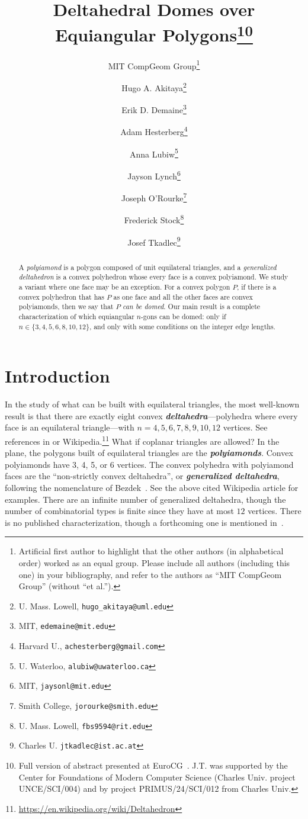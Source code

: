 \documentclass[11pt]{article}
\title{%
Deltahedral Domes over Equiangular Polygons\footnote{%
Full version of abstract presented at EuroCG~\cite{DomesEuroCG}.
J.T. was supported by the Center for Foundations of Modern Computer Science (Charles Univ. project UNCE/SCI/004) and by project PRIMUS/24/SCI/012 from Charles Univ.}
} %
\author{%
MIT CompGeom Group\thanks{%
Artificial first author to highlight that the other authors
(in alphabetical order) worked as an equal group.
Please include all authors (including this one) in your bibliography,
and refer to the authors as ``MIT CompGeom Group'' (without ``et al.'').}
\and
Hugo A. Akitaya\thanks{%
U. Mass. Lowell, \texttt{hugo\_akitaya@uml.edu}}
\and
Erik D. Demaine\thanks{%
MIT, \texttt{edemaine@mit.edu}}
\and
Adam Hesterberg\thanks{%
Harvard U., \texttt{achesterberg@gmail.com}}
\and
Anna Lubiw\thanks{%
U. Waterloo, \texttt{alubiw@uwaterloo.ca}}
\and
Jayson Lynch\thanks{%
MIT, \texttt{jaysonl@mit.edu}}
\and
Joseph O'Rourke\thanks{%
Smith College, \texttt{jorourke@smith.edu}}
\and
Frederick Stock\thanks{%
U. Mass. Lowell, \texttt{fbs9594@rit.edu}} 
\and
Josef Tkadlec\thanks{%
Charles U.
\texttt{jtkadlec@ist.ac.at}}
}%
\newcommand{\seclab}[1]{\label{sec:#1}}
\def\defn#1{\textit{\textbf{\boldmath #1}}}
\newcommand{\JOR}[1]{{\color{red} JOR: [#1]}}
\newcommand{\jor}[1]{{\color{cyan} #1}}
\newcommand{\Anna}[1]{{\color{red} Anna: [#1]}}
\begin{document}
\date{}
\maketitle



\begin{abstract}
A \emph{polyiamond} is a polygon composed of unit equilateral triangles, and
a \emph{generalized deltahedron}
is a convex polyhedron %
whose every face is a convex polyiamond.
We study a variant where one face may be an exception.
For a convex polygon $P$, 
if there is a convex polyhedron that has $P$ as one face and all the other faces are convex polyiamonds, then we say that 
$P$ \emph{can be domed}.
Our main result is a complete characterization of 
which equiangular $n$-gons can be domed:
only if $n \in \{3,4,5,6,8,10,12\}$, and only with some 
conditions on the integer edge lengths.
\end{abstract}



\section{Introduction}
\seclab{Introduction}
In the study of what can be built with equilateral triangles, the most well-known result is that there are exactly eight convex \defn{deltahedra}---polyhedra where every face is an equilateral triangle---with $n = 4,5,6,7,8,9,10,12$ vertices.
See references in \cite{bezdek2007proof} or
Wikipedia.\footnote{\url{https://en.wikipedia.org/wiki/Deltahedron}}
What if coplanar triangles are allowed?
In the plane, the polygons built of equilateral triangles are the \defn{polyiamonds}. Convex polyiamonds have 3, 4, 5, or 6 vertices.
The convex polyhedra with polyiamond faces are the 
``non-strictly convex deltahedra'', or \defn{generalized deltahedra}, following the nomenclature of Bezdek~\cite{bezdek2007proof}.
See the above cited Wikipedia article
for %
examples. 
There are an infinite number of generalized deltahedra, though  the number of combinatorial types is finite since they have at most $12$ vertices.
There is no published characterization, though a forthcoming one is mentioned in~\cite{bezdek2007proof}.
\end{document}
